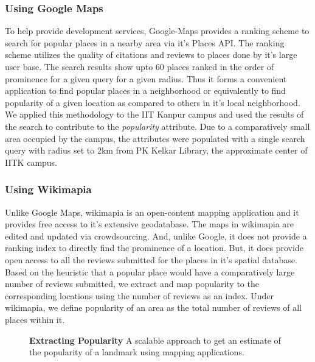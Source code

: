\documentclass{iitkthesis}
\begin{document}
\subsubsection*{Using Google Maps}
To help provide development services, Google-Maps provides a ranking 
scheme to search for popular places in a nearby area via it's Places API. 
The ranking scheme utilizes the quality of citations and reviews to 
places done by it's large user base. The search results show 
upto 60 places ranked in the order of prominence for a given query for a 
given radius. Thus it forms a convenient application to find popular 
places in a neighborhood or equivalently to find popularity of a given 
location as compared to others in it's local neighborhood. We applied this 
methodology to the IIT Kanpur campus and used the results of the search to 
contribute to the \textit{popularity} attribute. Due to a comparatively 
small area occupied by the campus, the attributes were populated with a 
single search query with radius set to 2km from PK Kelkar Library, the 
approximate center of IITK campus.

\subsubsection*{Using Wikimapia}
Unlike Google Maps, wikimapia is an open-content mapping application and 
it provides free access to it's extensive geodatabase. The maps in 
wikimapia are edited and updated via crowdsourcing. And, unlike 
Google, it does not provide a ranking index to directly find the 
prominence of a location. But, it does provide open access to all the 
reviews submitted for the places in it's spatial database. Based on the 
heuristic that a popular place would have a comparatively large number of 
reviews submitted, we extract and map popularity to the corresponding 
locations using the number of reviews as an index. Under wikimapia, we 
define popularity of an area as the total number of reviews of 
all places within it.
\begin{figure}
\centering
{}
\caption{\textbf{\textbf{Extracting Popularity}} A scalable approach to 
get an estimate of the popularity of a landmark using 
mapping applications.}
\label{fig:popular}
 \end{figure}
\end{document}

